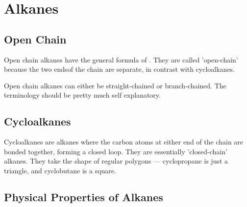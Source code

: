 


\pagebreak
\section{Alkanes}

\subsection{Open Chain}

	Open chain alkanes have the general formula of . They are called 'open-chain' because
	the two endsof the chain are separate, in contrast with cycloalkanes.

	Open chain alkanes can either be straight-chained or branch-chained. The terminology should be pretty much
	self explanatory.





\subsection{Cycloalkanes}

	Cycloalkanes are alkanes where the carbon atoms at either end of the chain are bonded together, forming a closed loop.
	They are essentially 'closed-chain' alkanes. They take the shape of regular polygons –– cyclopropane is just a triangle,
	and cyclobutane is a square.





\subsection{Physical Properties of Alkanes}
